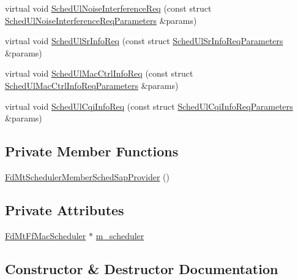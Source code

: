 \begin{DoxyCompactItemize}
\item 
virtual void \hyperlink{classns3_1_1FdMtSchedulerMemberSchedSapProvider_ae5fcac40db4c058be4d0021df94f0349}{Sched\+Ul\+Noise\+Interference\+Req} (const struct \hyperlink{structns3_1_1FfMacSchedSapProvider_1_1SchedUlNoiseInterferenceReqParameters}{Sched\+Ul\+Noise\+Interference\+Req\+Parameters} \&params)
\item 
virtual void \hyperlink{classns3_1_1FdMtSchedulerMemberSchedSapProvider_a73afce959bc8e574a90f2277e12afa80}{Sched\+Ul\+Sr\+Info\+Req} (const struct \hyperlink{structns3_1_1FfMacSchedSapProvider_1_1SchedUlSrInfoReqParameters}{Sched\+Ul\+Sr\+Info\+Req\+Parameters} \&params)
\item 
virtual void \hyperlink{classns3_1_1FdMtSchedulerMemberSchedSapProvider_a8f6acedf2d23cfd9d50801677a0b0c70}{Sched\+Ul\+Mac\+Ctrl\+Info\+Req} (const struct \hyperlink{structns3_1_1FfMacSchedSapProvider_1_1SchedUlMacCtrlInfoReqParameters}{Sched\+Ul\+Mac\+Ctrl\+Info\+Req\+Parameters} \&params)
\item 
virtual void \hyperlink{classns3_1_1FdMtSchedulerMemberSchedSapProvider_a8ce0067891161fbb73e025a5f2bcda60}{Sched\+Ul\+Cqi\+Info\+Req} (const struct \hyperlink{structns3_1_1FfMacSchedSapProvider_1_1SchedUlCqiInfoReqParameters}{Sched\+Ul\+Cqi\+Info\+Req\+Parameters} \&params)
\end{DoxyCompactItemize}
\subsection*{Private Member Functions}
\begin{DoxyCompactItemize}
\item 
\hyperlink{classns3_1_1FdMtSchedulerMemberSchedSapProvider_a6273a57c1926a7e7a69dcde8ca04ab3b}{Fd\+Mt\+Scheduler\+Member\+Sched\+Sap\+Provider} ()
\end{DoxyCompactItemize}
\subsection*{Private Attributes}
\begin{DoxyCompactItemize}
\item 
\hyperlink{classns3_1_1FdMtFfMacScheduler}{Fd\+Mt\+Ff\+Mac\+Scheduler} $\ast$ \hyperlink{classns3_1_1FdMtSchedulerMemberSchedSapProvider_aa742846f6610f058341167d53c0b7777}{m\+\_\+scheduler}
\end{DoxyCompactItemize}


\subsection{Constructor \& Destructor Documentation}
